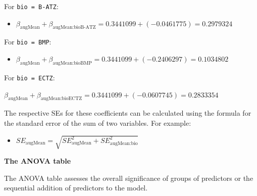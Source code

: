 \documentclass[
  letterpaper,
]{book}
\providecommand{\tightlist}{%
  \setlength{\itemsep}{0pt}\setlength{\parskip}{0pt}}\usepackage{longtable,booktabs,array}
\begin{document}
For \texttt{bio\ =\ B-ATZ}:

\begin{itemize}
\tightlist
\item
  \(\beta_{\text{augMean}} + \beta_{\text{augMean:bioB-ATZ}} = 0.3441099 + (-0.0461775) = 0.2979324\)
\end{itemize}

For \texttt{bio\ =\ BMP}:

\begin{itemize}
\tightlist
\item
  \(\beta_{\text{augMean}} + \beta_{\text{augMean:bioBMP}} = 0.3441099 + (-0.2406297) = 0.1034802\)
\end{itemize}

For \texttt{bio\ =\ ECTZ}:

\(\beta_{\text{augMean}} + \beta_{\text{augMean:bioECTZ}} = 0.3441099 + (-0.0607745) = 0.2833354\)

The respective SEs for these coefficients can be calculated using the
formula for the standard error of the sum of two variables. For example:

\begin{itemize}
\tightlist
\item
  \(SE_{\text{augMean}} = \sqrt{SE_{\text{augMean}}^2 + SE_{\text{augMean:bio}}^2}\)
\end{itemize}

\textbf{The ANOVA table}

The ANOVA table assesses the overall significance of groups of
predictors or the sequential addition of predictors to the model.
\end{document}
